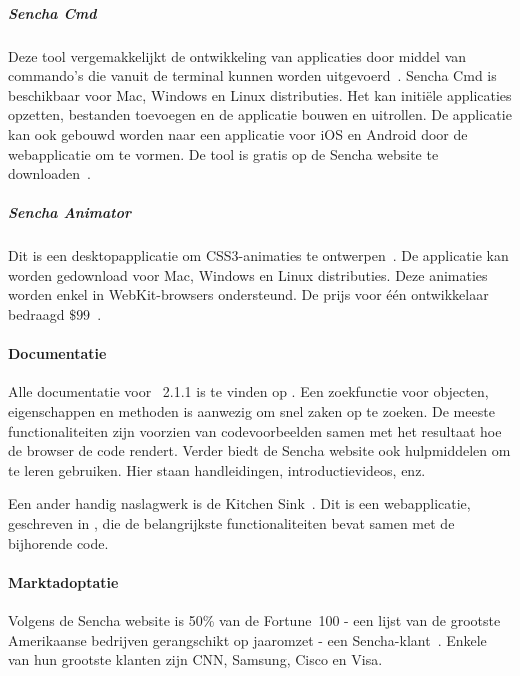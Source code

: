 \subparagraph{Sencha Cmd}
Deze tool vergemakkelijkt de ontwikkeling van \st{} applicaties door middel van commando's die vanuit de terminal kunnen worden uitgevoerd~\cite{Sencha2012}.
Sencha Cmd is beschikbaar voor Mac, Windows en Linux distributies.
Het kan initiële applicaties opzetten,  bestanden toevoegen en de applicatie bouwen en uitrollen.
De applicatie kan ook gebouwd worden naar een  applicatie voor iOS en Android door de webapplicatie om te vormen.
De tool is gratis op de Sencha website te downloaden~\cite{Inc.}.

\subparagraph{Sencha Animator}
Dit is een desktopapplicatie om CSS3-animaties te ontwerpen~\cite{Sencha2012b}.  
De applicatie kan worden gedownload voor Mac, Windows en Linux distributies.
Deze animaties worden enkel in WebKit-browsers ondersteund.
De prijs voor één ontwikkelaar bedraagd $\$99$~\cite{Inc.}.

% 

\paragraph{Documentatie}
Alle documentatie voor \st{}~2.1.1 is te vinden op .  
Een zoekfunctie voor objecten,  eigenschappen en methoden is aanwezig om snel zaken op te zoeken.  
De meeste functionaliteiten zijn voorzien van codevoorbeelden samen met het resultaat hoe de browser de code rendert.  
Verder biedt de Sencha website ook hulpmiddelen om \st{} te leren gebruiken.  
Hier staan handleidingen, introductievideos, enz.

Een ander handig naslagwerk is de Kitchen Sink~\cite{Inc.2013}.  
Dit is een webapplicatie,  geschreven in \st{},  die de belangrijkste functionaliteiten bevat samen met de bijhorende code.  

\paragraph{Marktadoptatie}
Volgens de Sencha website is 50\% van de Fortune~100 - een lijst van de grootste Amerikaanse bedrijven gerangschikt op jaaromzet - een Sencha-klant~\cite{Inc.}.  
Enkele van hun grootste klanten zijn CNN,  Samsung,  Cisco en  Visa.

